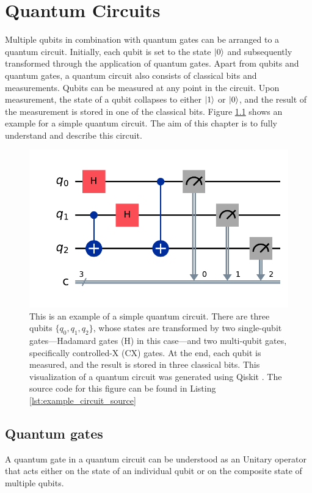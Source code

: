 \chapter{Quantum Circuits} \label{chap:circuits}
Multiple qubits in combination with quantum gates can be arranged to a quantum circuit.
Initially, each qubit is set to the state $\ket{0}$ and subsequently transformed through the application of quantum gates.
Apart from qubits and quantum gates, a quantum circuit also consists of classical bits and measurements.
Qubits can be measured at any point in the circuit.
Upon measurement, the state of a qubit collapses to either $\ket{1}$ or $\ket{0}$, and the result of the measurement is stored in one of the classical bits.
Figure \ref{fig:example_quantum_circuit} shows an example for a simple quantum circuit.
The aim of this chapter is to fully understand and describe this circuit.
\begin{figure}[H]
	\centering
	\includegraphics[width=0.5\linewidth]{figures/example_quantum_circuit.pdf}
	\caption{This is an example of a simple quantum circuit. There are three qubits $\{q_0,q_1,q_2\}$, whose states are transformed by two single-qubit gates—Hadamard gates (H) in this case—and two multi-qubit gates, specifically controlled-X (CX) gates. At the end, each qubit is measured, and the result is stored in three classical bits. This visualization of a quantum circuit was generated using Qiskit \cite{qiskit2024}. The source code for this figure can be found in Listing \ref{lst:example_circuit_source}}
	\label{fig:example_quantum_circuit}
\end{figure}
\section{Quantum gates}
	A quantum gate in a quantum circuit can be understood as an Unitary operator that acts either on the state of an individual qubit or on the composite state of multiple qubits.
